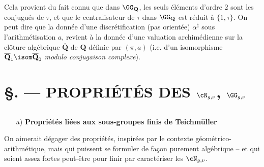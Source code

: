 \noindent Cela provient
du fait connu que dans $\GG_\mathbf{Q}$, les seuls éléments
d'ordre $2$ sont les conjugués de $\tau$, et que le
centralisateur de $\tau$ dans $\GG_\mathbf{Q}$ est réduit à
$\{1,\tau\}$.  On peut dire que la donnée d'une
discrétification (pas orientée) $\alpha^\natural$
sous l'arithmétisation $a$, revient à la donnée d'une
valuation archimédienne sur la cl\^ oture
algébrique $\overline{\mathbf{Q}}$ de $\mathbf{Q}$
définie par $(\pi,a)$ (i.e. d'un isomorphisme 
$\overline{\mathbf{Q}}_1 \isom \overline{\mathbf{Q}}_0$ {\it modulo conjugaison
complexe}).













\chapter*{\S {}. --- PROPRIÉTÉS DES $\cN_{g,\nu}$, $\GG_{g,\nu}$}\thispagestyle{empty}
\label{sec:30}
\section*{}

\begin{enumerate}
    \item[a)] {\bf Propriétés liées aux sous-groupes finis de Teichmüller}
\end{enumerate}

On aimerait dégager des propriétés, inspirées par le contexte
géométrico-arithmétique, mais qui puissent se formuler de
fa\c con purement algébrique -- et qui soient assez fortes peut-être
pour finir par caractériser les $\cN_{g,\nu}$.  

